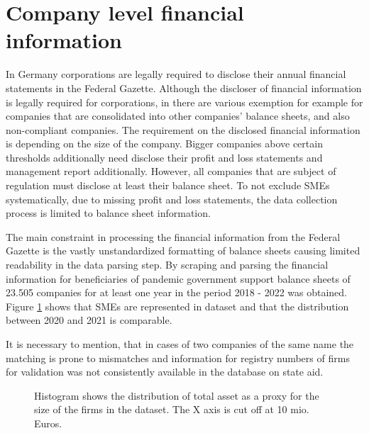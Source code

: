 \section{Company level financial information}

In Germany corporations are legally required to disclose their annual financial statements in the Federal Gazette. Although the discloser of financial information is legally required for corporations, in there are various exemption for example for companies that are consolidated into other companies' balance sheets, and also non-compliant companies.
The requirement on the disclosed financial information is depending on the size of the company. Bigger companies above certain thresholds additionally need disclose their profit and loss statements and management report additionally. However, all companies that are subject of regulation must disclose at least their balance sheet. 
To not exclude SMEs systematically, due to missing profit and loss statements, the data collection process is limited to balance sheet information. 

The main constraint in processing the financial information from the Federal Gazette is the vastly unstandardized formatting of balance sheets causing limited readability in the data parsing step. By scraping and parsing the financial information for beneficiaries of pandemic government support balance sheets of 23.505 companies for at least one year in the period 2018 - 2022 was obtained. Figure \ref{fig:FirmSizes} shows that SMEs are represented in dataset and that the distribution between 2020 and 2021 is comparable.

It is necessary to mention, that in cases of two companies of the same name the matching is prone to mismatches and information for registry numbers of firms for validation was not consistently available in the database on state aid.

\begin{figure}
    \centering
    
    \decoRule
    \caption[Firm size distribution in dataset]{Histogram shows the distribution of total asset as a proxy for the size of the firms in the dataset. The X axis is cut off at 10 mio. Euros.}
    \label{fig:FirmSizes}
\end{figure}


